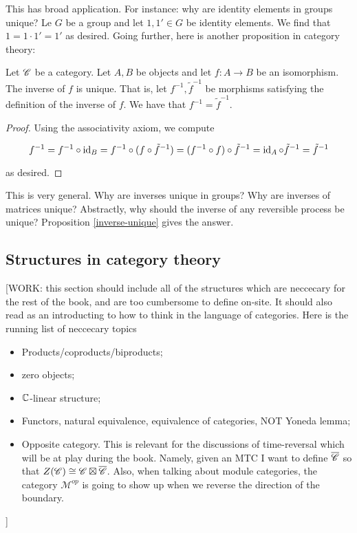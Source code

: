 This has broad application. For instance: why are identity elements in groups unique? Le $G$ be a group and let $1,1'\in G$ be identity elements. We find that $1=1\cdot 1' = 1'$ as desired. Going further, here is another proposition in category theory:

\begin{proposition}
\label{inverse-unique}
Let $\mathscr{C}$ be a category. Let $A,B$ be objects and let $f:A\to B$ be an isomorphism. The inverse of $f$ is unique. That is, let $f^{-1},\tilde{f}^{-1}$ be morphisms satisfying the definition of the inverse of $f$. We have that $f^{-1}=\tilde{f}^{-1}$.
\end{proposition}
\begin{proof} Using the associativity axiom, we compute

$$f^{-1}=f^{-1}\circ \operatorname{id} _{B} = f^{-1}\circ (f \circ \tilde{f}^{-1})=(f^{-1}\circ f)\circ \tilde{f}^{-1}=\operatorname{id}_A \circ \tilde{f}^{-1}=\tilde{f}^{-1}$$

as desired.
\end{proof}

This is very general. Why are inverses unique in groups? Why are inverses of matrices unique? Abstractly, why should the inverse of any reversible process be unique? Proposition \ref{inverse-unique} gives the answer.

\subsection{Structures in category theory}



[WORK: this section should include all of the structures which are neccecary for the rest of the book,
and are too cumbersome to define on-site. It should also read as an introducting to how to think in the language of categories. Here is the running list of neccecary topics

\begin{itemize}
\item Products/coproducts/biproducts;
\item zero objects;
\item $\mathbb{C}$-linear structure;
\item Functors, natural equivalence, equivalence of categories, NOT Yoneda lemma;
\item Opposite category. This is relevant for the discussions of time-reversal which will be at play during the book. Namely, given an MTC I want to define $\overline{\mathscr{C}}$ so that $Z(\mathscr{C})\cong \mathscr{C} \boxtimes \overline{\mathscr{C}}$. Also, when talking about module categories, the category $\mathcal{M}^{op}$ is going to show up when we reverse the direction of the boundary.
\end{itemize}
]

